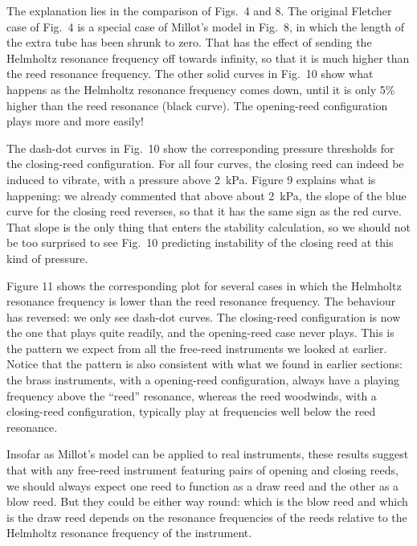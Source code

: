   The explanation lies in the comparison of Figs.\ 4 and 8. The original 
  Fletcher case of Fig.\ 4 is a special case of Millot’s model in Fig.\ 8, in 
  which the length of the extra tube has been shrunk to zero. That has the 
  effect of sending the Helmholtz resonance frequency off towards infinity, so 
  that it is much higher than the reed resonance frequency. The other solid 
  curves in Fig.\ 10 show what happens as the Helmholtz resonance frequency 
  comes down, until it is only 5\% higher than the reed resonance (black 
  curve). The opening-reed configuration plays more and more easily! 

  The dash-dot curves in Fig.\ 10 show the corresponding pressure thresholds 
  for the closing-reed configuration. For all four curves, the closing reed can 
  indeed be induced to vibrate, with a pressure above 2~kPa. Figure 9 explains 
  what is happening: we already commented that above about 2~kPa, the slope of 
  the blue curve for the closing reed reverses, so that it has the same sign as 
  the red curve. That slope is the only thing that enters the stability 
  calculation, so we should not be too surprised to see Fig.\ 10 predicting 
  instability of the closing reed at this kind of pressure. 

  Figure 11 shows the corresponding plot for several cases in which the 
  Helmholtz resonance frequency is lower than the reed resonance frequency. The 
  behaviour has reversed: we only see dash-dot curves. The closing-reed 
  configuration is now the one that plays quite readily, and the opening-reed 
  case never plays. This is the pattern we expect from all the free-reed 
  instruments we looked at earlier. Notice that the pattern is also consistent 
  with what we found in earlier sections: the brass instruments, with a 
  opening-reed configuration, always have a playing frequency above the “reed” 
  resonance, whereas the reed woodwinds, with a closing-reed configuration, 
  typically play at frequencies well below the reed resonance. 


  Insofar as Millot’s model can be applied to real instruments, these results 
  suggest that with any free-reed instrument featuring pairs of opening and 
  closing reeds, we should always expect one reed to function as a draw reed 
  and the other as a blow reed. But they could be either way round: which is 
  the blow reed and which is the draw reed depends on the resonance frequencies 
  of the reeds relative to the Helmholtz resonance frequency of the instrument. 

